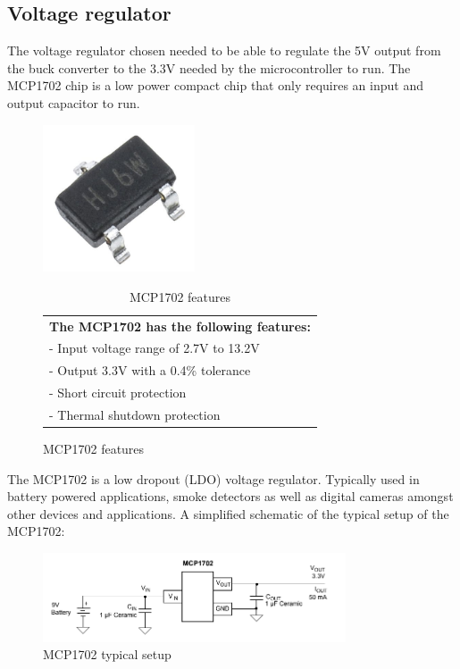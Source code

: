 \newpage
\subsection{Voltage regulator}
\vspace{4mm}
The voltage regulator chosen needed to be able to regulate the 5V output from the buck converter to the 3.3V needed by the microcontroller to run. The MCP1702 chip is a low power compact chip that only requires an input and output capacitor to run. 
\vspace{4mm}
\begin{figure}[H]
  \centering
  \begin{minipage}[b]{0.4\textwidth}
    \centering
    \includegraphics[width=0.4\textwidth]{MCP1702.jpg}
    \caption{MCP1702 chip}
  \end{minipage}
  \hfill
  \begin{minipage}[b]{0.55\textwidth}
    \begin{table}[H]
      \centering
        \begin{tabular}{|l|}
        \hline
          \textbf{The MCP1702 has the following features:}\\
            - Input voltage range of 2.7V to 13.2V\\
            - Output 3.3V with a 0.4\%  tolerance\\
            - Short circuit protection\\
            - Thermal shutdown protection\\
            \hline
        \end{tabular}
        \caption{MCP1702 features}
    \end{table}
  \end{minipage}
\end{figure}
\vspace{5mm}
The MCP1702 is a low dropout (LDO) voltage regulator. Typically used in battery powered applications, smoke detectors as well as digital cameras amongst other devices and applications.
\vspace{5mm}
A simplified schematic of the typical setup of the MCP1702:
\begin{figure}[H]
  \centering
    \includegraphics[width=0.8\textwidth]{MCP1702_setup.png}
    \caption{MCP1702 typical setup}
    \label{fig:model}
\end{figure}










 




 
